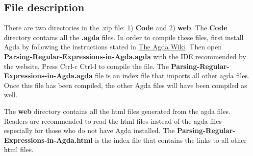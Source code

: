 \documentclass[twoside,openright,final]{bhamthesis}
\begin{document}
\tableofcontents















\nocite{*}




\begin{appendices}
\chapter{File description}

\par There are two directories in the .zip file: 1) \textbf{Code} and 2)
\textbf{web}. The \textbf{Code} directory contains all the
\textbf{.agda} files. In order to compile these files, first install
Agda by following the instructions stated in
\href{http://wiki.portal.chalmers.se/agda/pmwiki.php?n=Main.Download}{The
Agda Wiki}. Then open
\textbf{Parsing-Regular-Expressions-in-Agda.agda} with the IDE
recommended by the website. Press Ctrl-c Ctrl-l to compile the
file. The \textbf{Parsing-Regular-Expressions-in-Agda.agda} file is an
index file that imports all other agda files. Once this file has been
compiled, the other Agda files will have been compiled as well. 
\par The \textbf{web} directory contains all the html files generated
from the agda files. Readers are recommended to read the html files
instead of the agda files especially for those who do not have Agda
installed. The \textbf{Parsing-Regular-Expressions-in-Agda.html} is
the index file that contains the links to all other html files. 
\end{appendices}
\end{document}
